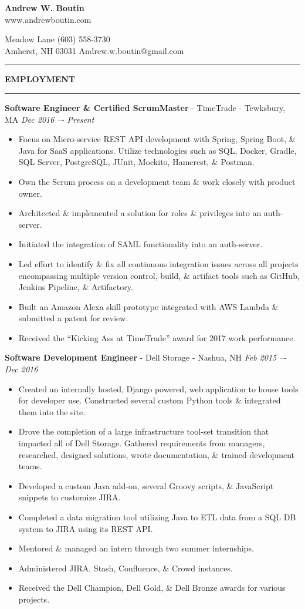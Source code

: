 \documentclass[a4paper,10pt]{article}
\begin{document}
\thispagestyle{empty}

{\centering
  \textbf{{\fontsize{13}{15.6} \selectfont Andrew W. Boutin}}\\
  www.andrewboutin.com\par
}
 Meadow Lane
\hfill
(603) 558-3730\\
Amherst, NH 03031
\hfill
Andrew.w.boutin@gmail.com
\noindent\rule{\linewidth}{0.4pt}

\noindent
\textbf{EMPLOYMENT}\\
\noindent\rule{\linewidth}{0.4pt}
\textbf{Software Engineer \& Certified ScrumMaster} - TimeTrade - Tewksbury, MA
\hfill
\textit{Dec 2016 –- Present}
\begin{itemize}
\item Focus on Micro-service REST API development with Spring, Spring Boot, \& Java for SaaS applications. Utilize technologies such as SQL, Docker, Gradle, SQL Server, PostgreSQL, JUnit, Mockito, Hamcrest, \& Postman.
\item Own the Scrum process on a development team \& work closely with product owner.
\item Architected \& implemented a solution for roles \& privileges into an auth-server.
\item Initiated the integration of SAML functionality into an auth-server.
\item Led effort to identify \& fix all continuous integration issues across all projects encompassing multiple version control, build, \& artifact tools such as GitHub, Jenkins Pipeline, \& Artifactory.
\item Built an Amazon Alexa skill prototype integrated with AWS Lambda \& submitted a patent for review.
\item Received the “Kicking Ass at TimeTrade” award for 2017 work performance.
\end{itemize}
\textbf{Software Development Engineer} - Dell Storage - Nashua, NH
\hfill
\textit{Feb 2015 –- Dec 2016}
\begin{itemize}
\item Created an internally hosted, Django powered, web application to house tools for developer use. Constructed several custom Python tools \& integrated them into the site.
\item Drove the completion of a large infrastructure tool-set transition that impacted all of Dell Storage. Gathered requirements from managers, researched, designed solutions, wrote documentation, \& trained development teams.
\item Developed a custom Java add-on, several Groovy scripts, \& JavaScript snippets to customize JIRA.
\item Completed a data migration tool utilizing Java to ETL data from a SQL DB system to JIRA using its REST API.
\item Mentored \& managed an intern through two summer internships.
\item Administered JIRA, Stash, Confluence, \& Crowd instances.
\item Received the Dell Champion, Dell Gold, \& Dell Bronze awards for various projects.
\end{itemize}
\end{document}
